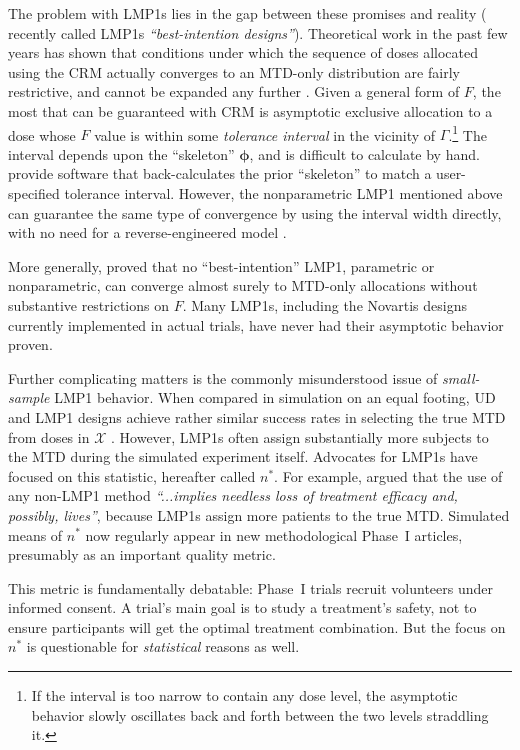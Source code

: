 The problem with LMP1s lies in the gap between these promises and reality (\cite{Fedo:Flou:Wu:Zhang:Best:2011} recently called LMP1s \emph{``best-intention designs''}). Theoretical work in the past few years has shown that conditions under which the sequence of doses allocated using the CRM actually converges to an MTD-only distribution are fairly restrictive, and cannot be expanded any further \citep{Azri:anot:2012,Lee:Cheu:interv:calibr:2009,oron:azri:hoff:dose:2011}. Given a general form of $F$, the most that can be guaranteed with CRM is asymptotic exclusive allocation to a dose whose $F$ value is within some \emph{tolerance interval} in the vicinity of $\Gamma$.\footnote{If the interval is too narrow to contain any dose level, the asymptotic behavior slowly oscillates back and forth between the two levels straddling it.} The interval depends upon the ``skeleton'' $\boldsymbol{\phi}$, and is difficult to calculate by hand. \cite{Lee:Cheu:interv:calibr:2009} provide software that back-calculates the prior ``skeleton'' to match a user-specified tolerance interval. However, the nonparametric LMP1 mentioned above can guarantee the same type of convergence by using the interval width directly, with no need for a reverse-engineered model \citep{Ivan:Flou:Chun:Cumu:2007,oron:azri:hoff:dose:2011}.

More generally, \cite{Azri:etal:imposs:2011} proved that no ``best-intention'' LMP1, parametric or nonparametric, can converge almost surely to MTD-only allocations without substantive restrictions on $F$. Many LMP1s, including the Novartis designs currently implemented in actual trials, have never had their asymptotic behavior proven.

Further complicating matters is the commonly misunderstood issue of \emph{small-sample} LMP1 behavior. When compared in simulation on an equal footing, UD and LMP1 designs achieve rather similar success rates in selecting the true MTD from doses in $\mathcal{X}$ \citep{Oron:Hoff:smal:2013}. However, LMP1s often assign substantially more subjects to the MTD during the simulated experiment itself. Advocates for LMP1s have focused on this statistic, hereafter called $n^*$. For example, \cite{Rogat:etal:oped:2007} argued that the use of any non-LMP1 method \emph{``...implies needless loss of treatment efficacy and, possibly, lives''}, because LMP1s assign more patients to the true MTD. Simulated means of $n^*$ now regularly appear in new methodological Phase~I articles, presumably as an important quality metric.

This metric is fundamentally debatable: Phase~I trials recruit volunteers under informed consent. A trial's main goal is to study a treatment's safety, not to ensure participants will get the optimal treatment combination. But the focus on $n^*$ is questionable for \emph{statistical} reasons as well.

